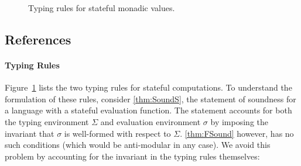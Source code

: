 \begin{figure}
\caption{Typing rules for stateful monadic values.}
\label{fig:WFM+State}
\vspace{-.4cm}
\end{figure}

\subsection{References}

\paragraph{Typing Rules}

Figure~\ref{fig:WFM+State} lists the two typing rules for stateful
computations.  To understand the formulation of these rules, consider
\ref{thm:SoundS}, the statement of soundness for a language with a
stateful evaluation function. The statement accounts for both the
typing environment $\Sigma$ and evaluation environment $\sigma$ by
imposing the invariant that $\sigma$ is well-formed with respect
to $\Sigma$. \ref{thm:FSound} however, has no such conditions (which
would be anti-modular in any case). We avoid this problem by
accounting for the invariant in the typing rules themselves:

